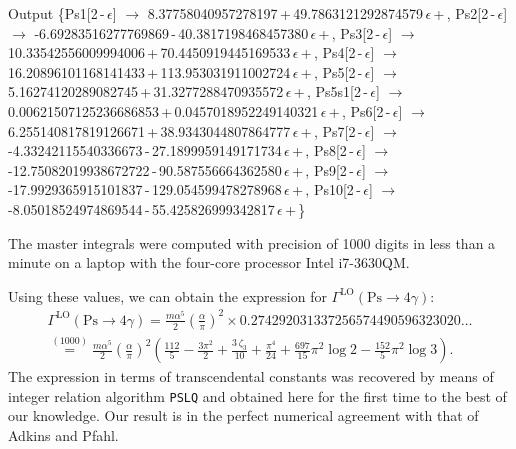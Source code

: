 \documentclass[sort&compress]{elsarticle}
\begin{document}
\begin{mmaCell}{Output}
	\{Ps1[2\,-\,\(\epsilon\)] \(\to\) 8.37758040957278197\,+\,49.7863121292874579\,\(\epsilon\)\,+\,,
	 Ps2[2\,-\,\(\epsilon\)] \(\to\) -6.69283516277769869\,-\,40.3817198468457380\,\(\epsilon\)\,+\,,
	 Ps3[2\,-\,\(\epsilon\)] \(\to\) 10.33542556009994006\,+\,70.4450919445169533\,\(\epsilon\)\,+\,,
	 Ps4[2\,-\,\(\epsilon\)] \(\to\) 16.20896101168141433\,+\,113.953031911002724\,\(\epsilon\)\,+\,,
	 Ps5[2\,-\,\(\epsilon\)] \(\to\) 5.16274120289082745\,+\,31.3277288470935572\,\(\epsilon\)\,+\,,
	 Ps5s1[2\,-\,\(\epsilon\)] \(\to\) 0.00621507125236686853\,+\,0.0457018952249140321\,\(\epsilon\)\,+\,,
	 Ps6[2\,-\,\(\epsilon\)] \(\to\) 6.255140817819126671\,+\,38.9343044807864777\,\(\epsilon\)\,+\,,
	 Ps7[2\,-\,\(\epsilon\)] \(\to\) -4.33242115540336673\,-\,27.1899959149171734\,\(\epsilon\)\,+\,,
	 Ps8[2\,-\,\(\epsilon\)] \(\to\) -12.75082019938672722\,-\,90.587556664362580\,\(\epsilon\)\,+\,,
	 Ps9[2\,-\,\(\epsilon\)] \(\to\) -17.9929365915101837\,-\,129.054599478278968\,\(\epsilon\)\,+\,,
	 Ps10[2\,-\,\(\epsilon\)] \(\to\) -8.05018524974869544\,-\,55.425826999342817\,\(\epsilon\)\,+\,\}
\end{mmaCell}
The master integrals were computed with precision of 1000 digits in less than a minute on a laptop with the four-core processor Intel i7-3630QM.

Using these values, we can obtain the expression for $\Gamma^{\text{LO}}(\mathrm{Ps}\to4\gamma)$:
\begin{multline}
	\Gamma^{\text{LO}}(\mathrm{Ps}\to4\gamma) = 
		\frac{m \alpha^5}{2} \left(\frac{\alpha}{\pi}\right)^2 \times 0.274292031337256574490596323020\ldots \\ \overset{(1000)}{=}
		\frac{m \alpha^5}{2} \left(\frac{\alpha}{\pi}\right)^2 \left( \frac{112}{5}-\frac{3 \pi ^2}{2}+\frac{3\,\zeta_3}{10}+\frac{\pi ^4}{24}+\frac{697}{15} \pi ^2 \log 2-\frac{152}{5} \pi ^2 \log 3 \right).
\end{multline}
The expression in terms of transcendental constants was recovered by means of integer relation algorithm \texttt{PSLQ} \cite{FergusonBailey:1992:PSLQ}
and obtained here for the first time to the best of our knowledge.
Our result is in the perfect numerical agreement with that of Adkins and Pfahl.
\end{document}
